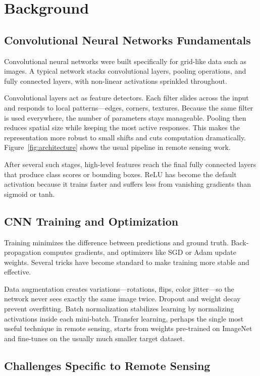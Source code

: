 \documentclass[12pt,a4paper]{article}
\begin{document}
\section{Background}
\label{sec:background}

\subsection{Convolutional Neural Networks Fundamentals}

Convolutional neural networks were built specifically for grid-like data such as images. A typical network stacks convolutional layers, pooling operations, and fully connected layers, with non-linear activations sprinkled throughout.

Convolutional layers act as feature detectors. Each filter slides across the input and responds to local patterns—edges, corners, textures. Because the same filter is used everywhere, the number of parameters stays manageable. Pooling then reduces spatial size while keeping the most active responses. This makes the representation more robust to small shifts and cuts computation dramatically. Figure~\ref{fig:architecture} shows the usual pipeline in remote sensing work.

After several such stages, high-level features reach the final fully connected layers that produce class scores or bounding boxes. ReLU has become the default activation because it trains faster and suffers less from vanishing gradients than sigmoid or tanh.

\subsection{CNN Training and Optimization}

Training minimizes the difference between predictions and ground truth. Back-propagation computes gradients, and optimizers like SGD or Adam update weights. Several tricks have become standard to make training more stable and effective.

Data augmentation creates variations—rotations, flips, color jitter—so the network never sees exactly the same image twice. Dropout and weight decay prevent overfitting. Batch normalization stabilizes learning by normalizing activations inside each mini-batch. Transfer learning, perhaps the single most useful technique in remote sensing, starts from weights pre-trained on ImageNet and fine-tunes on the usually much smaller target dataset.

\subsection{Challenges Specific to Remote Sensing}
\end{document}
